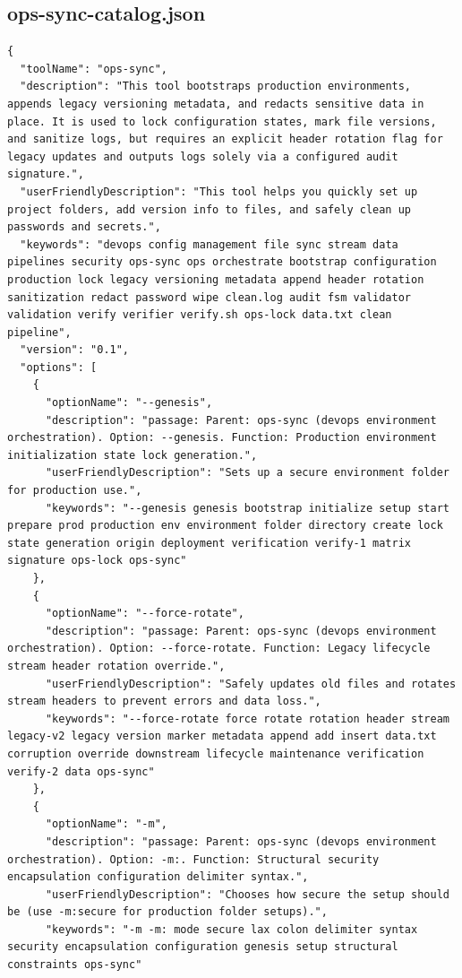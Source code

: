 \begin{appendix}
\subsection{ops-sync-catalog.json}
\begin{lstlisting}
{
  "toolName": "ops-sync",
  "description": "This tool bootstraps production environments, appends legacy versioning metadata, and redacts sensitive data in place. It is used to lock configuration states, mark file versions, and sanitize logs, but requires an explicit header rotation flag for legacy updates and outputs logs solely via a configured audit signature.",
  "userFriendlyDescription": "This tool helps you quickly set up project folders, add version info to files, and safely clean up passwords and secrets.",
  "keywords": "devops config management file sync stream data pipelines security ops-sync ops orchestrate bootstrap configuration production lock legacy versioning metadata append header rotation sanitization redact password wipe clean.log audit fsm validator validation verify verifier verify.sh ops-lock data.txt clean pipeline",
  "version": "0.1",
  "options": [
    {
      "optionName": "--genesis",
      "description": "passage: Parent: ops-sync (devops environment orchestration). Option: --genesis. Function: Production environment initialization state lock generation.",
      "userFriendlyDescription": "Sets up a secure environment folder for production use.",
      "keywords": "--genesis genesis bootstrap initialize setup start prepare prod production env environment folder directory create lock state generation origin deployment verification verify-1 matrix signature ops-lock ops-sync"
    },
    {
      "optionName": "--force-rotate",
      "description": "passage: Parent: ops-sync (devops environment orchestration). Option: --force-rotate. Function: Legacy lifecycle stream header rotation override.",
      "userFriendlyDescription": "Safely updates old files and rotates stream headers to prevent errors and data loss.",
      "keywords": "--force-rotate force rotate rotation header stream legacy-v2 legacy version marker metadata append add insert data.txt corruption override downstream lifecycle maintenance verification verify-2 data ops-sync"
    },
    {
      "optionName": "-m",
      "description": "passage: Parent: ops-sync (devops environment orchestration). Option: -m:. Function: Structural security encapsulation configuration delimiter syntax.",
      "userFriendlyDescription": "Chooses how secure the setup should be (use -m:secure for production folder setups).",
      "keywords": "-m -m: mode secure lax colon delimiter syntax security encapsulation configuration genesis setup structural constraints ops-sync"

\end{lstlisting}
\end{appendix}
